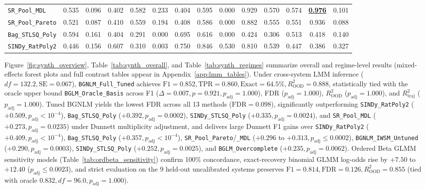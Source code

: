 \documentclass{article}
\begin{document}
\begin{table}[t]
{\begin{tabular}{lccccccccccccc}
\texttt{SR\_Pool\_MDL} & 0.535 & 0.096 & 0.402 & 0.582 & 0.233 & 0.404 & 0.595 & 0.000 & 0.929 & 0.570 & 0.574 & \underline{\textbf{0.976}} & 0.101 \\
\texttt{SR\_Pool\_Pareto} & 0.521 & 0.087 & 0.410 & 0.559 & 0.194 & 0.408 & 0.586 & 0.000 & 0.882 & 0.555 & 0.551 & 0.936 & 0.088 \\
\texttt{Bag\_STLSQ\_Poly} & 0.594 & 0.161 & 0.404 & 0.291 & 0.000 & 0.695 & 0.616 & 0.000 & 0.424 & 0.306 & 0.513 & 0.418 & 0.140 \\
\texttt{SINDy\_RatPoly2} & 0.446 & 0.156 & 0.607 & 0.310 & 0.003 & 0.750 & 0.846 & 0.530 & 0.810 & 0.539 & 0.447 & 0.386 & 0.327 \\
\bottomrule
\end{tabular}%
}
\end{table}

Figure~\ref{fig:synth_overview}, Table~\ref{tab:synth_overall}, and Table~\ref{tab:synth_regimes} summarize overall and regime-level results (mixed-effects forest plots and full contrast tables appear in Appendix~\ref{app:lmm_tables}). Under cross-system LMM inference ($df = 132.2, \text{SE}=0.067$), \texttt{BGNLM\_Full\_Tuned} achieves $\text{F1}=0.852, \text{TPR}=0.860, \text{Exact}=64.5\%, R^2_{\text{OOD}}=0.888$, statistically tied with the oracle upper bound \texttt{BGLM\_Oracle\_Basis} across F1 ($\Delta=0.007, p=0.921, p_{\text{adj}}=1.000$), FDR ($p_{\text{adj}}=1.000$), $R^2_{\text{OOD}}$ ($p_{\text{adj}}=1.000$), and $R^2_{\text{traj}}$ ($p_{\text{adj}}=1.000$). Tuned BGNLM yields the lowest FDR across all 13 methods ($\text{FDR}=0.098$), significantly outperforming \texttt{SINDy\_RatPoly2} ($+0.509, p_{\text{adj}}<10^{-4}$), \texttt{Bag\_STLSQ\_Poly} ($+0.392, p_{\text{adj}}=0.0002$), \texttt{SINDy\_STLSQ\_Poly} ($+0.335, p_{\text{adj}}=0.0024$), and \texttt{SR\_Pool\_MDL} ($+0.273, p_{\text{adj}}=0.0235$) under Dunnett multiplicity adjustment, and delivers large Dunnett F1 gains over \texttt{SINDy\_RatPoly2} ($+0.409, p_{\text{adj}}<10^{-4}$), \texttt{Bag\_STLSQ\_Poly} ($+0.357, p_{\text{adj}}<10^{-4}$), \texttt{SR\_Pool\_Pareto}/\texttt{\_MDL} ($+0.296$ to $+0.313, p_{\text{adj}} \le 0.0002$), \texttt{BGNLM\_IWSM\_Untuned} ($+0.290, p_{\text{adj}}=0.0003$), \texttt{SINDy\_STLSQ\_Poly} ($+0.252, p_{\text{adj}}=0.0025$), and \texttt{BGLM\_Overcomplete} ($+0.235, p_{\text{adj}}=0.0062$). Ordered Beta GLMM sensitivity models (Table~\ref{tab:ordbeta_sensitivity}) confirm 100\% concordance, exact-recovery binomial GLMM log-odds rise by $+7.50$ to $+12.40$ ($p_{\text{adj}} \le 0.0023$), and strict evaluation on the 9 held-out uncalibrated systems preserves $\text{F1}=0.814, \text{FDR}=0.126, R^2_{\text{OOD}}=0.855$ (tied with oracle $0.832, df=96.0, p_{\text{adj}}=1.000$).
\end{document}
